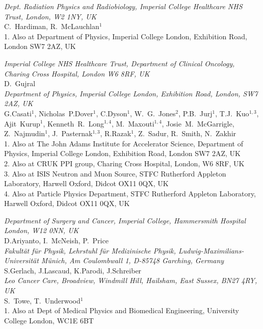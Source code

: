 \noindent \textit{Dept. Radiation Physics and Radiobiology, Imperial College Healthcare NHS Trust, London, W2 1NY, UK} \\
C.~Hardiman, R.~McLauchlan$^{1}$ \\
{\footnotesize
  1. Also at Department of Physics, Imperial College London, Exhibition Road, London SW7 2AZ, UK \\
}
 
\noindent \textit{Imperial College NHS Healthcare Trust, Department of Clinical Oncology, Charing Cross Hospital, London W6 8RF, UK} \\
D.~Gujral \\
 
\noindent \textit{Department of Physics, Imperial College London, Exhibition Road, London, SW7 2AZ, UK} \\
G.Casati$^{1}$, Nicholas~P.Dover$^{1}$, C.Dyson$^{1}$, W.~G.~Jones$^{2}$, P.B.~Jurj$^{1}$, T.J.~Kuo$^{1, 3}$, Ajit~Kurup$^{1}$, Kenneth~R.~Long$^{1, 4}$, M.~Maxouti$^{1, 4}$, Josie~M.~McGarrigle, Z.~Najmudin$^{1}$, J.~Pasternak$^{1, 3}$, R.Razak$^{1}$, Z.~Sadur, R.~Smith, N.~Zakhir \\
{\footnotesize
  1. Also at The John Adams Institute for Accelerator Science, Department of Physics, Imperial College London, Exhibition Road, London SW7 2AZ, UK \\
  2. Also at CRUK PPI group, Charing Cross Hospital, London, W6 8RF, UK \\
  3. Also at ISIS Neutron and Muon Source, STFC Rutherford Appleton Laboratory, Harwell Oxford, Didcot OX11 0QX, UK \\
  4. Also at Particle Physics Department, STFC Rutherford Appleton Laboratory, Harwell Oxford, Didcot OX11 0QX, UK \\
}
 
\noindent \textit{Department of Surgery and Cancer, Imperial College, Hammersmith Hospital London, W12 0NN, UK} \\
D.Ariyanto, I.~McNeish, P.~Price \\
 
\noindent \textit{Fakult\"at f\"ur Physik, Lehrstuhl f\"ur Medizinische Physik, Ludwig-Maximilians-Universit\"at M\"unich, Am Coulombwall 1, D-85748 Garching, Germany} \\
S.Gerlach, J.Lascaud, K.Parodi, J.Schreiber \\
 
\noindent \textit{Leo Cancer Care, Broadview, Windmill Hill, Hailsham, East Sussex, BN27 4RY, UK} \\
S.~Towe, T.~Underwood$^{1}$ \\
{\footnotesize
  1. Also at Dept of Medical Physics and Biomedical Engineering, University College London, WC1E 6BT \\
}
 
